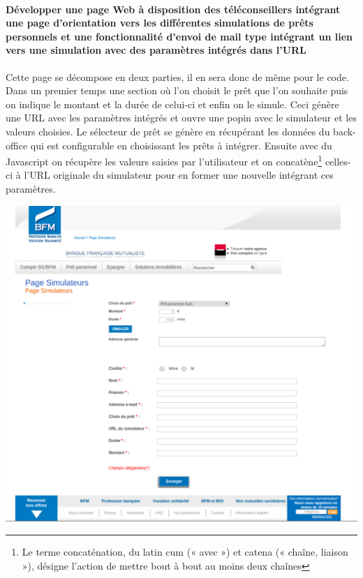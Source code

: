 \documentclass[a4paper,11pt,twoside]{report}
\begin{document}
      \paragraph*{Développer une page Web à disposition des téléconseillers intégrant une page d’orientation vers les différentes simulations de prêts personnels et une fonctionnalité d’envoi de mail type intégrant un lien vers une simulation avec des paramètres intégrés dans l’URL}
      Cette page se décompose en deux parties, il en sera donc de même pour le code. Dans un premier temps une section où l'on choisit le prêt que l'on souhaite puis on indique le montant et la durée de celui-ci et enfin on le simule. Ceci génère une URL avec les paramètres intégrés et ouvre une popin avec le simulateur et les valeurs choisies. Le sélecteur de prêt se génère en récupérant les données du back-office qui est configurable en choisissant les prêts à intégrer. Ensuite avec du Javascript on récupère les valeurs saisies par l'utilisateur et on concatène\footnote{Le terme concaténation, du latin cum (« avec ») et catena (« chaîne, liaison »), désigne l'action de mettre bout à bout au moins deux chaînes} celles-ci à l'URL originale du simulateur pour en former une nouvelle intégrant ces paramètres. 
      \begin{center}
	\includegraphics[width=\textwidth]{images/page_teleconseille1.png}  
	\label{page_teleconseille_formulaire}
      \end{center}
\end{document}

